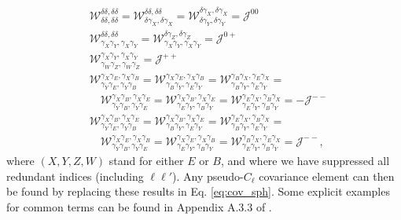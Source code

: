 \documentclass[a4paper,11pt]{article}
\begin{document}
        \begin{align}
          &\mathcal{W}^{\delta  \delta  ,\delta  \delta  }_{\delta  \delta  ,\delta  \delta  }=
           \mathcal{W}^{\delta  \delta  ,\delta  \delta  }_{\delta  \gamma_X,\delta  \gamma_X}=
           \mathcal{W}^{\delta  \gamma_X,\delta  \gamma_X}_{\delta  \gamma_Y,\delta  \gamma_Y}=\mathcal{J}^{00}\\
          &\mathcal{W}^{\delta  \delta  ,\delta  \delta  }_{\gamma_X\gamma_Y,\gamma_X\gamma_Y}=
           \mathcal{W}^{\delta  \gamma_Z,\delta  \gamma_Z}_{\gamma_X\gamma_Y,\gamma_X\gamma_Y}=\mathcal{J}^{0+}\\
          &\mathcal{W}^{\gamma_X\gamma_Y,\gamma_X\gamma_Y}_{\gamma_W\gamma_Z,\gamma_W\gamma_Z}=\mathcal{J}^{++}\\\nonumber
          &\mathcal{W}^{\gamma_X\gamma_E,\gamma_X\gamma_B}_{\gamma_Y\gamma_E,\gamma_Y\gamma_B}=
           \mathcal{W}^{\gamma_X\gamma_E,\gamma_X\gamma_B}_{\gamma_B\gamma_Y,\gamma_E\gamma_Y}=
           \mathcal{W}^{\gamma_B\gamma_X,\gamma_E\gamma_X}_{\gamma_B\gamma_Y,\gamma_E\gamma_Y}=\\
          &\hspace{12pt}
           \mathcal{W}^{\gamma_X\gamma_B,\gamma_X\gamma_E}_{\gamma_Y\gamma_B,\gamma_Y\gamma_E}=
           \mathcal{W}^{\gamma_X\gamma_B,\gamma_X\gamma_E}_{\gamma_E\gamma_Y,\gamma_B\gamma_Y}=
           \mathcal{W}^{\gamma_E\gamma_X,\gamma_B\gamma_X}_{\gamma_E\gamma_Y,\gamma_B\gamma_Y}=-\mathcal{J}^{--}\\\nonumber
          &\mathcal{W}^{\gamma_X\gamma_B,\gamma_X\gamma_E}_{\gamma_Y\gamma_E,\gamma_Y\gamma_B}=
           \mathcal{W}^{\gamma_X\gamma_B,\gamma_X\gamma_E}_{\gamma_B\gamma_Y,\gamma_E\gamma_Y}=
           \mathcal{W}^{\gamma_E\gamma_X,\gamma_B\gamma_X}_{\gamma_B\gamma_Y,\gamma_E\gamma_Y}=\\
          &\hspace{12pt}
           \mathcal{W}^{\gamma_X\gamma_E,\gamma_X\gamma_B}_{\gamma_Y\gamma_B,\gamma_Y\gamma_E}=
           \mathcal{W}^{\gamma_X\gamma_E,\gamma_X\gamma_B}_{\gamma_E\gamma_Y,\gamma_B\gamma_Y}=
           \mathcal{W}^{\gamma_B\gamma_X,\gamma_E\gamma_X}_{\gamma_E\gamma_Y,\gamma_B\gamma_Y}=\mathcal{J}^{--},
        \end{align}
        where $(X,Y,Z,W)$ stand for either $E$ or $B$, and where we have suppressed all redundant indices (including $\ell\ell'$). Any pseudo-$C_\ell$ covariance element can then be found by replacing these results in Eq. \ref{eq:cov_sph}. Some explicit examples for common terms can be found in Appendix A.3.3 of \cite{2017A&A...602A..41C}.
\end{document}
